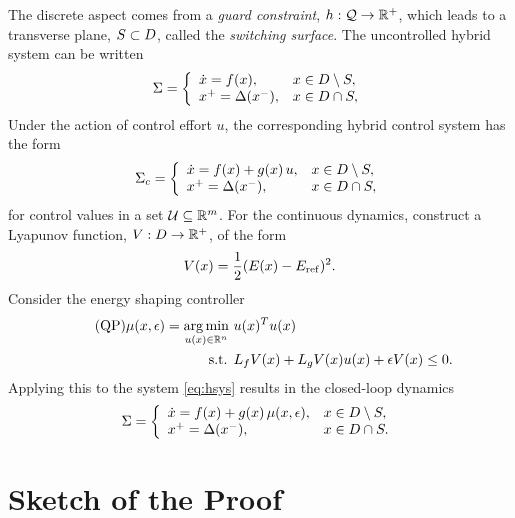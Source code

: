 \documentclass[twocolumn]{article}
\begin{document}
The discrete aspect comes from a {\em guard constraint}, $h : \mathcal{Q} \to \mathbb{R}^{+}$, which leads to a transverse plane, $S \subset D$, called the {\em switching surface}.
%
The uncontrolled hybrid system can be written
\begin{align}
  \Sigma = \left\{
  \begin{array}{l l}
    {\dot x} = f(x), & x \in D \setminus S,\\
    x^{+} = \Delta(x^{-}), &x \in D \cap S,
  \end{array}\right.
  \label{eq:hsys}
\end{align}
Under the action of control effort $u$, the corresponding hybrid control system has the form
\begin{align}
  \Sigma_{c} = \left\{
  \begin{array}{l l}
    {\dot x} = f(x) + g(x) \, u, & x \in D \setminus S,\\
    x^{+} = \Delta(x^{-}), &x \in D \cap S,
  \end{array}\right.
  \label{eq:csys}
\end{align}
for control values in a set $\mathcal{U} \subseteq \mathbb{R}^{m}$.
%
For the continuous dynamics, construct a Lyapunov function, $V : D \to \mathbb{R}^{+}$, of the form
\begin{align}
  \label{eq:lyap}
  V(x) = \frac{1}{2} (E(x) - E_{\mathrm{ref}})^2.
\end{align}
Consider the energy shaping controller
\begin{align}
  \label{eq:es-qp} \tag {QP}
  \mu(x, \epsilon) = \operatorname*{arg\,min}_{u(x) \in \mathbb{R}^{n}} \ & u(x)^T u(x)\\
  \nonumber
  \mbox{s.t. } & L_{f} V(x) + L_{g} V(x) u(x) + \epsilon V(x) \leq 0.
\end{align}
Applying this to the system \eqref{eq:hsys} results in the closed-loop dynamics
\begin{align}
  \label{eq:hsys-cl}
  \Sigma = \left\{
  \begin{array}{l l}
    {\dot x} = f(x) + g(x) \, \mu(x, \epsilon), & x \in D \setminus S,\\
    x^{+} = \Delta(x^{-}), &x \in D \cap S.
  \end{array}\right.
\end{align}

\section{Sketch of the Proof}
\end{document}
